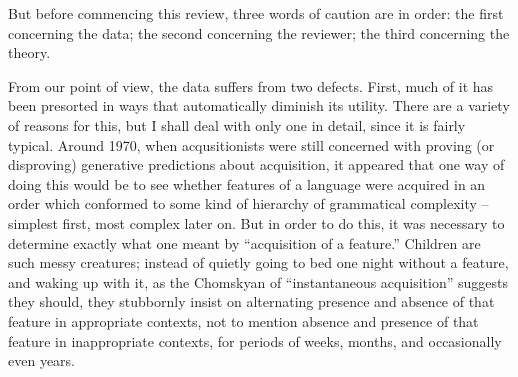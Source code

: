 But before commencing this review, three words of caution are in order: the first concerning the data; the second concerning the reviewer; the third concerning the theory.

From our point of view, the data suffers from two defects. First, much of it has been presorted in ways that automatically diminish its utility. There are a variety of reasons for this, but I shall deal with only one in detail, since it is fairly typical. Around 1970, when acqusitionists were still concerned with proving (or disproving) generative predictions about acquisition, it appeared that one way of doing this would be to see whether features of a language were acquired in an order which conformed to some kind of hierarchy of grammatical complexity -- simplest first, most complex later on. But in order to do this, it was necessary to determine exactly what one meant by ``acquisition of a feature.'' Children are such messy creatures; instead of quietly going to bed one night without a feature, and waking up with it, as the Chomskyan  of ``instantaneous acquisition'' suggests they should, they stubbornly insist on alternating presence and absence of that feature in appropriate contexts, not to mention absence and presence of that feature in inappropriate contexts, for periods of weeks, months, and occasionally even years.


